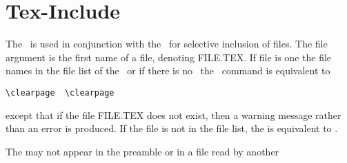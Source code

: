 \section {Tex-Include}

\verb||

The \ is used in conjunction with the \ for
selective inclusion of files. The file argument is the first name of a file,
denoting FILE.TEX. If file is one the file names in the file list of the
\ or if there is no \ the \
command is equivalent to

\begin{verbatim}
\clearpage  \clearpage
\end{verbatim} 


except that if the file FILE.TEX does not exist, then a warning message
rather than an error is produced. If the file is not in the file list, the
 is equivalent to \clearpage.

The  may not appear in the preamble or in a file read by
another 